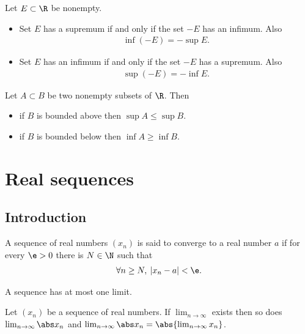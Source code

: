 \documentclass{article}
\begin{document}
\begin{theorem}
    Let $E\subset\R$ be nonempty.
    \begin{itemize}
        \item Set $E$ has a supremum if and only if the set $-E$ has an infimum. Also \begin{align*}
                  \inf(-E) = -\sup E.
              \end{align*}
        \item Set $E$ has an infimum if and only if the set $-E$ has a supremum. Also \begin{align*}
                  \sup(-E) = -\inf E.
              \end{align*}
    \end{itemize}
\end{theorem}

\begin{lemma}
    Let $A\subset B$ be two nonempty subsets of $\R$. Then
    \begin{itemize}
        \item if $B$ is bounded above then $\sup A\leq\sup B$.
        \item if $B$ is bounded below then $\inf A\geq\inf B$.
    \end{itemize}
\end{lemma}


\section{Real sequences}


\subsection{Introduction}

\begin{definition}
    A sequence of real numbers $(x_n)$ is said to converge to a real number $a$
    if for every $\e>0$ there is $N\in\N$ such that
    \begin{align*}
        \forall n\geq N,\: |x_n-a|<\e.
    \end{align*}
\end{definition}

\setcounter{theorem}{5}
\begin{lemma}
    A sequence has at most one limit.
\end{lemma}

\begin{lemma}
    Let $(x_n)$ be a sequence of real numbers. If $\lim_{n\to\infty}$ exists then so does
    $\lim_{n\to\infty}\abs x_n$ and $\lim_{n\to\infty}\abs x_n=\abs{\lim_{n\to\infty}x_n}$.
\end{lemma}
\end{document}
